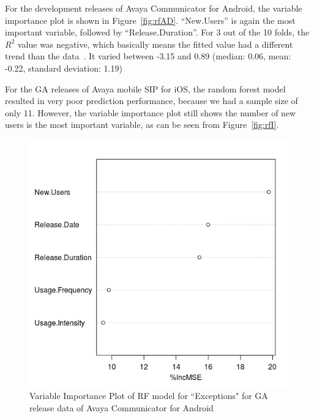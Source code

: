 \documentclass[smallextended]{svjour3}       %
\begin{document}
For the development releases of Avaya Communicator for Android, the variable importance plot is shown in Figure~\ref{fig:rfAD}. ``New.Users'' is again the most important variable, followed by ``Release.Duration''. 
For 3 out of the 10 folds, the $R^2$ value was negative, which basically means the fitted value had a different trend than the data~\cite{negRsq}. It varied between -3.15 and 0.89 (median: 0.06, mean: -0.22, standard deviation: 1.19)

For the GA releases of Avaya mobile SIP for iOS, the random forest model 
resulted in very poor prediction performance, because we had a sample size 
of only 11. However, the variable importance plot still shows the number of 
new users is the most important variable, as can be seen from Figure~\ref{fig:rfI}.

\begin{figure}[!t]
\centering
\begin{minipage}{.45\textwidth}
\includegraphics[width=\linewidth]{rfAGA}%
\caption{Variable Importance Plot of RF model for ``Exceptions" for GA release data of Avaya Communicator for Android}
\label{fig:rfAGA}
\end{minipage}
\hfill
\begin{minipage}{.45\textwidth}

\end{minipage}
\end{figure}
\end{document}
